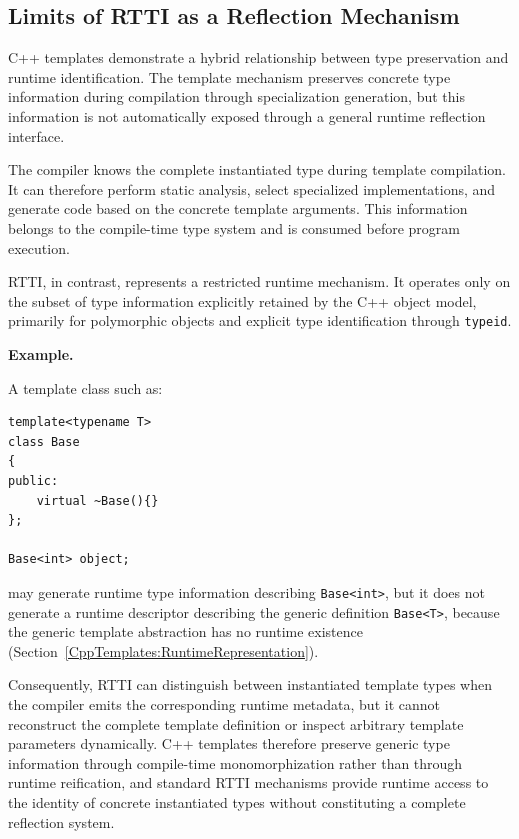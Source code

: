 \documentclass[11pt]{report}
\begin{document}
\subsection{Limits of RTTI as a Reflection Mechanism}

C++ templates demonstrate a hybrid relationship between type preservation
and runtime identification. The template mechanism preserves concrete type
information during compilation through specialization generation, but this
information is not automatically exposed through a general runtime
reflection interface.

The compiler knows the complete instantiated type during template
compilation. It can therefore perform static analysis, select specialized
implementations, and generate code based on the concrete template arguments.
This information belongs to the compile-time type system and is consumed
before program execution.

RTTI, in contrast, represents a restricted runtime mechanism. It operates
only on the subset of type information explicitly retained by the C++ object
model, primarily for polymorphic objects and explicit type identification
through \texttt{typeid}.

\begin{examplebox}
\textbf{Example.}

A template class such as:

\begin{lstlisting}
template<typename T>
class Base
{
public:
    virtual ~Base(){}
};

Base<int> object;
\end{lstlisting}
may generate runtime type information describing \texttt{Base<int>}, but it
does not generate a runtime descriptor describing the generic definition
\texttt{Base<T>}, because the generic template abstraction has no runtime
existence (Section~\ref{CppTemplates:RuntimeRepresentation}).
\end{examplebox}



Consequently, RTTI can distinguish between instantiated template types when
the compiler emits the corresponding runtime metadata, but it cannot
reconstruct the complete template definition or inspect arbitrary template
parameters dynamically. C++ templates therefore preserve generic type
information through compile-time monomorphization rather than through
runtime reification, and standard RTTI mechanisms provide runtime access to
the identity of concrete instantiated types without constituting a complete
reflection system.
\end{document}
